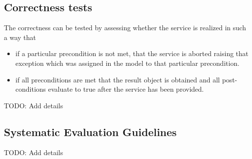 \subsection{Correctness tests}

The correctness can be tested by assessing whether the service is realized in such a way that
\begin{itemize}
  \item if a particular precondition is not met, that the service is aborted raising that exception which was assigned in the model to that particular precondition.
  \item if all preconditions are met that the result object is obtained and all post-conditions evaluate to true after the service has been provided.
\end{itemize}

TODO: Add details
% 


\subsection{Systematic Evaluation Guidelines}
TODO: Add details

